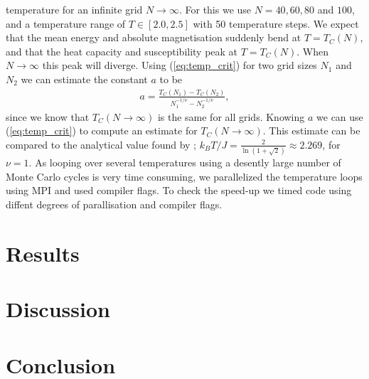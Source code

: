\documentclass[twocolumn]{aastex62}
\begin{document}
temperature for an infinite grid $N\to \infty$. For this we use $N = 40, 60, 80$
and $100$, and a temperature range of $T\in[2.0, 2.5]$ with 50 temperature steps. We expect that the mean energy
and absolute magnetisation suddenly bend at $T = T_C(N)$, and that the heat
capacity and susceptibility peak at $T = T_C(N)$. When $N\to\infty$ this peak
will diverge. Using (\ref{eq:temp_crit}) for two grid sizes $N_1$ and $N_2$ we
can estimate the constant $a$ to be 
\begin{align}
	a = \frac{T_C(N_1) - T_C(N_2)}{N_1^{-1/\nu} - N_2^{-1/\nu}},
\end{align}
since we know that $T_C(N\to\infty)$ is the same for all grids. Knowing $a$ we
can use (\ref{eq:temp_crit}) to compute an estimate for $T_C(N\to\infty)$. This
estimate can be compared to the analytical value found by \cite{onsager:1944};
$k_BT/J = \frac{2}{\ln(1+\sqrt{2})}\approx 2.269$, for $\nu = 1$.
As looping over several temperatures using a desently large number of Monte
Carlo cycles is very time consuming, we parallelized the temperature loops using
MPI and used compiler flags. To check the speed-up we timed code using diffent
degrees of parallisation and compiler flags.

\section{Results} \label{sec:results}

\begin{figure*}
	\texttt{[image: \{Figures/thermo\_quants]}.pdf}
	\caption{}
	\label{fig:thermo_quants}
\end{figure*}

\section{Discussion} \label{sec:discussion}

\section{Conclusion} \label{sec:conclusion}




\end{document}
